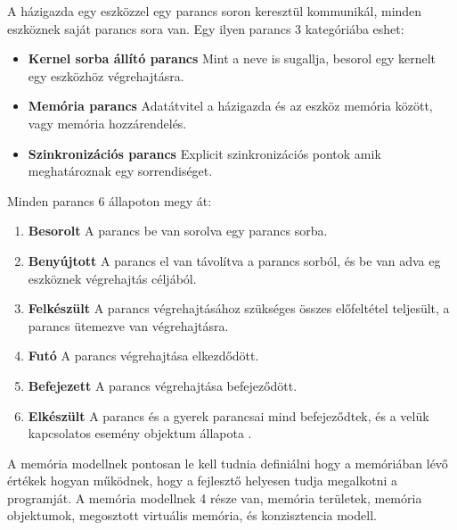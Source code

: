 A házigazda egy eszközzel egy parancs soron keresztül kommunikál, minden eszköznek saját parancs sora van. Egy ilyen parancs 3 kategóriába eshet:
\begin{itemize}
\item\textbf{Kernel sorba állító parancs} Mint a neve is sugallja, besorol egy kernelt egy eszközhöz végrehajtásra.
\item\textbf{Memória parancs} Adatátvitel a házigazda és az eszköz memória között, vagy memória hozzárendelés.
\item\textbf{Szinkronizációs parancs} Explicit szinkronizációs pontok amik meghatároznak egy sorrendiséget.
\end{itemize}
Minden parancs 6 állapoton megy át:
\begin{enumerate}
\item\textbf{Besorolt} A parancs be van sorolva egy parancs sorba.
\item\textbf{Benyújtott} A parancs el van távolítva a parancs sorból, és be van adva eg eszköznek végrehajtás céljából.
\item\textbf{Felkészült} A parancs végrehajtásához szükséges összes előfeltétel teljesült, a parancs ütemezve van végrehajtásra.
\item\textbf{Futó} A parancs végrehajtása elkezdődött.
\item\textbf{Befejezett} A parancs végrehajtása befejeződött.
\item\textbf{Elkészült} A parancs és a gyerek parancsai mind befejeződtek, és a velük kapcsolatos esemény objektum állapota .
\end{enumerate}

A memória modellnek pontosan le kell tudnia definiálni hogy a memóriában lévő értékek hogyan működnek, hogy a fejlesztő helyesen tudja megalkotni a programját. A memória modellnek 4 része van, memória területek, memória objektumok, megosztott virtuális memória, és konzisztencia modell.

